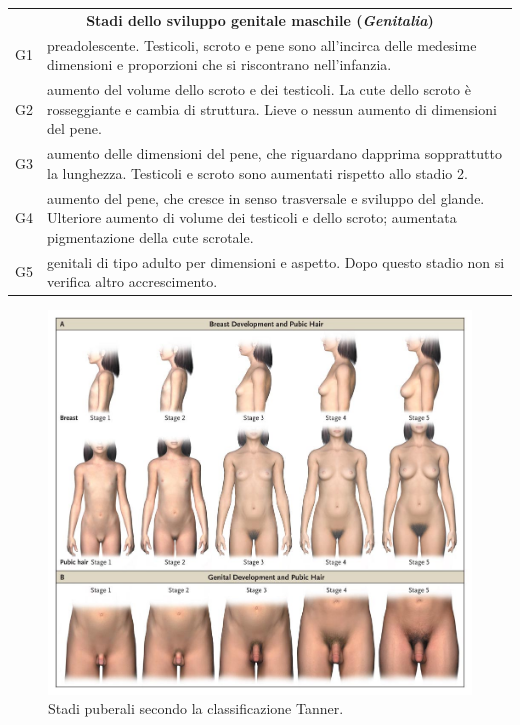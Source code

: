 \begin{table}[!h]
\begin{tabular}{lp{13.3cm}}
\midrule
\multicolumn{2}{c}{\textbf{Stadi dello sviluppo genitale maschile (\emph{Genitalia})}}\\
G1 &	preadolescente. Testicoli, scroto e pene sono all'incirca delle medesime dimensioni e proporzioni che si riscontrano nell'infanzia.\\
G2 &	aumento del volume dello scroto e dei testicoli. La cute dello scroto è rosseggiante e cambia di struttura. 
		Lieve o nessun aumento di dimensioni del pene.\\
G3 &	aumento delle dimensioni del pene, che riguardano dapprima sopprattutto la lunghezza.
		Testicoli e scroto sono aumentati rispetto allo stadio 2.\\
G4 &	aumento del pene, che cresce in senso trasversale e sviluppo del glande. Ulteriore aumento di volume dei testicoli e dello scroto; 
		aumentata pigmentazione della cute scrotale.\\
G5 &	genitali di tipo adulto per dimensioni e aspetto. Dopo questo stadio non si verifica altro accrescimento.\\
\bottomrule
\end{tabular}
\end{table}

\clearpage

\begin{figure}[h]
  \begin{center}
      \includegraphics[scale=0.43]{grafici/Tanner_Stages} %
  \end{center}
  \caption{Stadi puberali secondo la classificazione Tanner.}
\end{figure}

